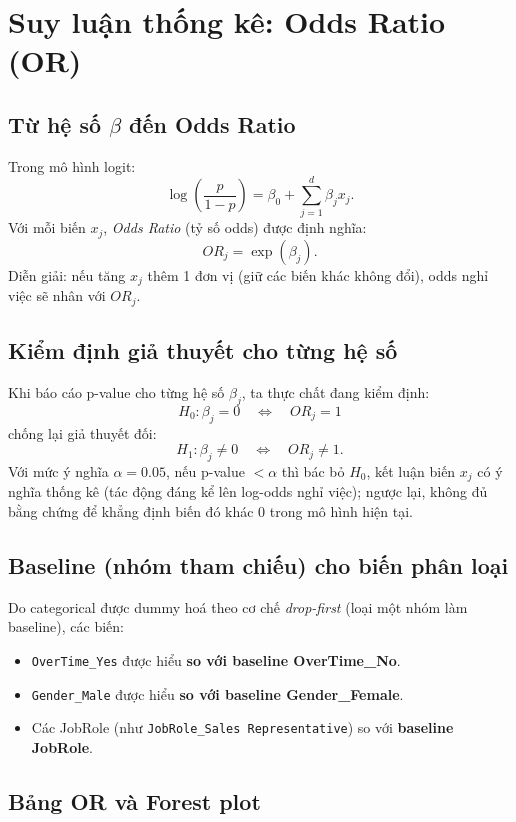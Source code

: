 \chapter{Suy luận thống kê: Odds Ratio (OR)}

\section{Từ hệ số \texorpdfstring{$\beta$}{beta} đến Odds Ratio}
Trong mô hình logit:
\[
\log\left(\frac{p}{1-p}\right) = \beta_0 + \sum_{j=1}^{d}\beta_j x_j.
\]
Với mỗi biến \(x_j\), \textit{Odds Ratio} (tỷ số odds) được định nghĩa:
\[
OR_j = \exp(\beta_j).
\]
Diễn giải: nếu tăng \(x_j\) thêm 1 đơn vị (giữ các biến khác không đổi), odds nghỉ việc sẽ nhân với \(OR_j\).

\section{Kiểm định giả thuyết cho từng hệ số}
Khi báo cáo p-value cho từng hệ số \(\beta_j\), ta thực chất đang kiểm định:
\[
H_0: \beta_j = 0 \quad \Leftrightarrow \quad OR_j = 1
\]
chống lại giả thuyết đối:
\[
H_1: \beta_j \neq 0 \quad \Leftrightarrow \quad OR_j \neq 1.
\]
Với mức ý nghĩa \(\alpha = 0.05\), nếu p-value \(< \alpha\) thì bác bỏ \(H_0\), kết luận biến \(x_j\) có ý nghĩa thống kê (tác động đáng kể lên log-odds nghỉ việc); ngược lại, không đủ bằng chứng để khẳng định biến đó khác 0 trong mô hình hiện tại.

\section{Baseline (nhóm tham chiếu) cho biến phân loại}
Do categorical được dummy hoá theo cơ chế \textit{drop-first} (loại một nhóm làm baseline), các biến:
\begin{itemize}
  \item \texttt{OverTime\_Yes} được hiểu \textbf{so với baseline OverTime\_No}.
  \item \texttt{Gender\_Male} được hiểu \textbf{so với baseline Gender\_Female}.
  \item Các JobRole (như \texttt{JobRole\_Sales Representative}) so với \textbf{baseline JobRole}.
\end{itemize}

\section{Bảng OR và Forest plot}


